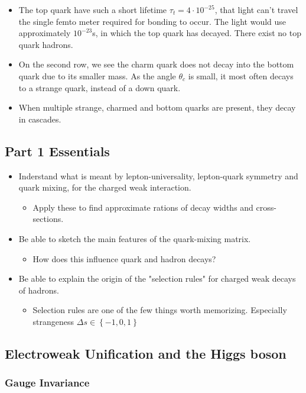 \begin{itemize}
  \item The top quark have such a short lifetime $τ_{t} = 4 ⋅ 10^{-25}$, that light can't travel the single femto meter required for bonding to occur. The light would use approximately $10^{-23}$s, in which the top quark has decayed. There exist no top quark hadrons. 
  \item On the second row, we see the charm quark does not decay into the bottom quark due to its smaller mass. As the angle $θ_{c}$ is small, it most often decays to a strange quark, instead of a down quark. 
  \item When multiple strange, charmed and bottom quarks are present, they decay in cascades.
\end{itemize}

\subsection{Part 1 Essentials}
\begin{itemize}
  \item Inderstand what is meant by lepton-universality, lepton-quark symmetry and quark mixing, for the charged weak interaction.
  \begin{itemize}
    \item Apply these to find approximate rations of decay widths and cross-sections. 
  \end{itemize}
  \item Be able to sketch the main features of the quark-mixing matrix. 
  \begin{itemize}
    \item How does this influence quark and hadron decays?
  \end{itemize} 
  \item Be able to explain the origin of the "selection rules" for charged weak decays of hadrons. 
  \begin{itemize}
    \item Selection rules are one of the few things worth memorizing. Especially strangeness $Δs ∈ \left\{-1,0,1\right\}$
  \end{itemize}
\end{itemize}

\subsection{Electroweak Unification and the Higgs boson}
\subsubsection{Gauge Invariance}
